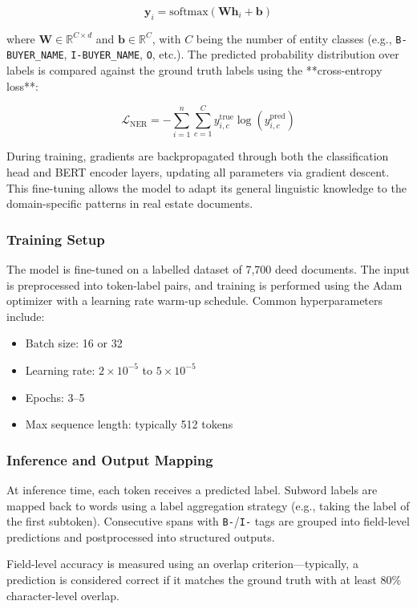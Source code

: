 \documentclass{article}
\begin{document}
\[
\mathbf{y}_i = \text{softmax}(\mathbf{W} \mathbf{h}_i + \mathbf{b})
\]

where $\mathbf{W} \in \mathbb{R}^{C \times d}$ and $\mathbf{b} \in \mathbb{R}^C$, with $C$ being the number of entity classes (e.g., \texttt{B-BUYER\_NAME}, \texttt{I-BUYER\_NAME}, \texttt{O}, etc.). The predicted probability distribution over labels is compared against the ground truth labels using the **cross-entropy loss**:

\[
\mathcal{L}_{\text{NER}} = -\sum_{i=1}^{n} \sum_{c=1}^{C} y_{i,c}^{\text{true}} \log(y_{i,c}^{\text{pred}})
\]

During training, gradients are backpropagated \cite{rumelhart1986learning} through both the classification head and BERT encoder layers, updating all parameters via gradient descent. This fine-tuning allows the model to adapt its general linguistic knowledge to the domain-specific patterns in real estate documents.

\subsubsection{Training Setup}

The model is fine-tuned on a labelled dataset of 7,700 deed documents. The input is preprocessed into token-label pairs, and training is performed using the Adam optimizer with a learning rate warm-up schedule. Common hyperparameters include:
\begin{itemize}
    \item Batch size: 16 or 32
    \item Learning rate: $2 \times 10^{-5}$ to $5 \times 10^{-5}$
    \item Epochs: 3–5
    \item Max sequence length: typically 512 tokens
\end{itemize}

\subsubsection{Inference and Output Mapping}

At inference time, each token receives a predicted label. Subword labels are mapped back to words using a label aggregation strategy (e.g., taking the label of the first subtoken). Consecutive spans with \texttt{B-}/\texttt{I-} tags are grouped into field-level predictions and postprocessed into structured outputs.

Field-level accuracy is measured using an overlap criterion—typically, a prediction is considered correct if it matches the ground truth with at least 80\% character-level overlap.
\end{document}
